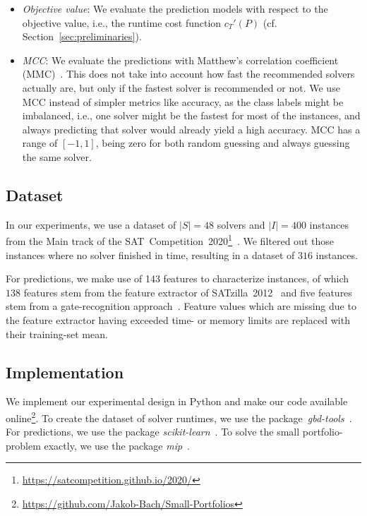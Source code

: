 \documentclass[conference]{IEEEtran}
\begin{document}
\begin{itemize}
	\item \emph{Objective value}:
	We evaluate the prediction models with respect to the objective value, i.e., the runtime cost function $c_{T}'(P)$ (cf. Section~\ref{sec:preliminaries}). 
	\item \emph{MCC}:
	We evaluate the predictions with Matthew's correlation coefficient (MMC)~\cite{matthews1975comparison, gorodkin2004comparing}.
	This does not take into account how fast the recommended solvers actually are, but only if the fastest solver is recommended or not.
	We use MCC instead of simpler metrics like accuracy, as the class labels might be imbalanced, i.e., one solver might be the fastest for most of the instances, and always predicting that solver would already yield a high accuracy.
	MCC has a range of $[-1,1]$, being zero for both random guessing and always guessing the same solver.
\end{itemize}

\subsection{Dataset}

In our experiments, we use a dataset of $|S| = 48$ solvers and $|I| = 400$ instances from the Main track of the SAT~Competition~2020\footnote{\url{https://satcompetition.github.io/2020/}}~\cite{balyo2020proceedings, SC2020:AIJ}. 
We filtered out those instances where no solver finished in time, resulting in a dataset of $316$ instances. 

For predictions, we make use of 143 features to characterize instances, of which 
$138$ features stem from the feature extractor of SATzilla~2012~\cite{xu2008satzilla, xu2012satzilla2012} and five features stem from a gate-recognition approach~\cite{iser2020recognition}. 
Feature values which are missing due to the feature extractor having exceeded time- or memory limits are replaced with their training-set mean. 

\subsection{Implementation}

We implement our experimental design in Python and make our code available online\footnote{\url{https://github.com/Jakob-Bach/Small-Portfolios}}.
To create the dataset of solver runtimes, we use the package~\emph{gbd-tools}~\cite{iser2020collaborative}.
For predictions, we use the package \emph{scikit-learn}~\cite{scikit-learn}.
To solve the small portfolio-problem exactly, we use the package \emph{mip}~\cite{python-mip}.
\end{document}
